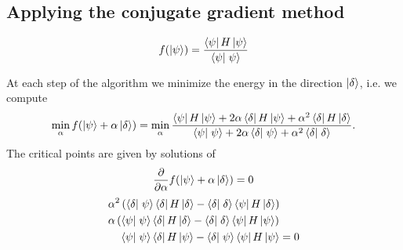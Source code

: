 \subsection{Applying the conjugate gradient method}

\begin{equation}
  f( \ket{\psi} )
  = \frac{\matrixel{\psi}{H}{\psi}}{\braket{\psi}{\psi}}
  \label{}
\end{equation}

At each step of the algorithm we minimize the energy in the direction
$\left| \delta \right>$, i.e. we compute
\begin{equation}
  \min_{\alpha} f( \ket{\psi} + \alpha \ket{\delta} )
  = \min_{\alpha}
  \frac{
      \matrixel{\psi}{H}{\psi}
      + 2 \alpha \matrixel{\delta}{H}{\psi}
      + \alpha^2 \matrixel{\delta}{H}{\delta}
    }
    {
      \braket{\psi}{\psi}
      + 2 \alpha \braket{\delta}{\psi}
      + \alpha^2 \braket{\delta}{\delta}
    }.
  \label{}
\end{equation}
The critical points are given by solutions of
\begin{equation}
  \frac{\partial }{\partial \alpha} f(\left| \psi \right> + \alpha \left| \delta \right>) = 0
  \label{}
\end{equation}
\begin{align}
  &\alpha^2 \left( \braket{\delta}{\psi} \matrixel{\delta}{H}{\delta}
    - \braket{\delta}{\delta} \matrixel{\psi}{H}{\delta} \right) \\
  &\alpha \left( \braket{\psi}{\psi} \matrixel{\delta}{H}{\delta}
    - \braket{\delta}{\delta} \matrixel{\psi}{H}{\psi} \right) \\
  &\phantom{\alpha(} \braket{\psi}{\psi} \matrixel{\delta}{H}{\psi}
    - \braket{\delta}{\psi} \matrixel{\psi}{H}{\psi} = 0
  \label{}
\end{align}


